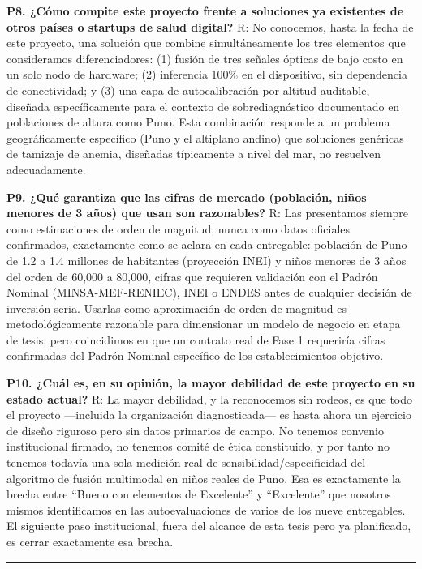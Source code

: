 \documentclass[11pt,a4paper]{article}
\begin{document}
\textbf{P8. ¿Cómo compite este proyecto frente a soluciones ya existentes de otros países o startups de salud digital?}
R: No conocemos, hasta la fecha de este proyecto, una solución que combine simultáneamente los tres elementos que consideramos diferenciadores: (1) fusión de tres señales ópticas de bajo costo en un solo nodo de hardware; (2) inferencia 100\% en el dispositivo, sin dependencia de conectividad; y (3) una capa de autocalibración por altitud auditable, diseñada específicamente para el contexto de sobrediagnóstico documentado en poblaciones de altura como Puno. Esta combinación responde a un problema geográficamente específico (Puno y el altiplano andino) que soluciones genéricas de tamizaje de anemia, diseñadas típicamente a nivel del mar, no resuelven adecuadamente.

\textbf{P9. ¿Qué garantiza que las cifras de mercado (población, niños menores de 3 años) que usan son razonables?}
R: Las presentamos siempre como estimaciones de orden de magnitud, nunca como datos oficiales confirmados, exactamente como se aclara en cada entregable: población de Puno de 1.2 a 1.4 millones de habitantes (proyección INEI) y niños menores de 3 años del orden de 60,000 a 80,000, cifras que requieren validación con el Padrón Nominal (MINSA-MEF-RENIEC), INEI o ENDES antes de cualquier decisión de inversión seria. Usarlas como aproximación de orden de magnitud es metodológicamente razonable para dimensionar un modelo de negocio en etapa de tesis, pero coincidimos en que un contrato real de Fase 1 requeriría cifras confirmadas del Padrón Nominal específico de los establecimientos objetivo.

\textbf{P10. ¿Cuál es, en su opinión, la mayor debilidad de este proyecto en su estado actual?}
R: La mayor debilidad, y la reconocemos sin rodeos, es que todo el proyecto ---incluida la organización diagnosticada--- es hasta ahora un ejercicio de diseño riguroso pero sin datos primarios de campo. No tenemos convenio institucional firmado, no tenemos comité de ética constituido, y por tanto no tenemos todavía una sola medición real de sensibilidad/especificidad del algoritmo de fusión multimodal en niños reales de Puno. Esa es exactamente la brecha entre ``Bueno con elementos de Excelente'' y ``Excelente'' que nosotros mismos identificamos en las autoevaluaciones de varios de los nueve entregables. El siguiente paso institucional, fuera del alcance de esta tesis pero ya planificado, es cerrar exactamente esa brecha.

\begin{center}\rule{0.5\linewidth}{0.5pt}\end{center}
\end{document}

